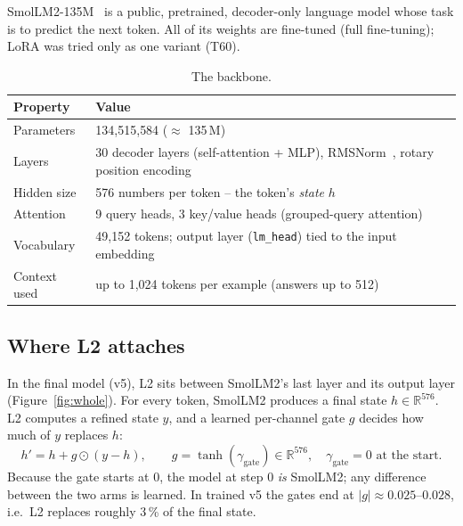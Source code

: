 \documentclass[a4paper,11pt,parskip=half]{scrartcl}
\newcommand{\code}[1]{\texttt{\small #1}}
\begin{document}
SmolLM2-135M~\cite{smollm2} is a public, pretrained, decoder-only language
model whose task is to predict the next token. All of its weights are
fine-tuned (full fine-tuning); LoRA was tried only as one variant (T60).

\begin{table}[H]
\centering\small
\begin{tabularx}{0.9\linewidth}{@{}lY@{}}
\toprule
Property & Value\\
\midrule
Parameters & 134{,}515{,}584 ($\approx$ 135\,M)\\
Layers & 30 decoder layers (self-attention + MLP), RMSNorm~\cite{rmsnorm}, rotary position encoding\\
Hidden size & 576 numbers per token -- the token's \emph{state} $h$\\
Attention & 9 query heads, 3 key/value heads (grouped-query attention)\\
Vocabulary & 49{,}152 tokens; output layer (\code{lm\_head}) tied to the input embedding\\
Context used & up to 1{,}024 tokens per example (answers up to 512)\\
\bottomrule
\end{tabularx}
\caption{The backbone.}
\end{table}

\subsection{Where L2 attaches}

In the final model (v5), L2 sits between SmolLM2's last layer and its output
layer (Figure~\ref{fig:whole}). For every token, SmolLM2 produces a final state
$h\in\mathbb{R}^{576}$. L2 computes a refined state $y$, and a learned
per-channel gate $g$ decides how much of $y$ replaces $h$:
\begin{equation}
  h' = h + g \odot (y - h), \qquad g = \tanh(\gamma_{\text{gate}}) \in \mathbb{R}^{576}, \quad \gamma_{\text{gate}} = 0 \text{ at the start.}
  \label{eq:gate}
\end{equation}
Because the gate starts at 0, the model at step 0 \emph{is} SmolLM2; any
difference between the two arms is learned. In trained v5 the gates end at
$|g| \approx 0.025$--$0.028$, i.e.\ L2 replaces roughly 3\,\% of the final state.
\end{document}
